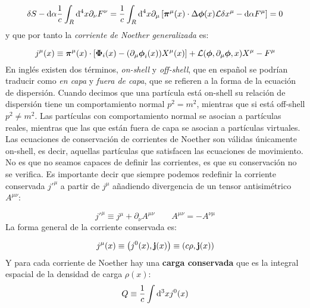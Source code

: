 \begin{equation}
 	\delta S - \mathrm{d} \alpha \frac{1}{c} \int_R\mathrm{d}^4 x \partial_\nu F^\nu = \frac{1}{c} \int_R\mathrm{d}^4 x \partial_\mu \left[ \boldsymbol{\pi}^\mu (x) \cdot \Delta \boldsymbol{\phi} (x)  \mathcal{L}  \delta x^\mu - \mathrm{d} \alpha F^\mu  \right] = 0
\end{equation}
y que por tanto la \textit{corriente de Noether generalizada} es: 

\begin{equation}
	j^\mu (x)\equiv \boldsymbol{\pi}^\mu (x) \cdot \left[  \boldsymbol{\Phi}_i (x) - (\partial_\mu \boldsymbol{\phi}_i (x))X^\mu(x) \right]+ \mathcal{L} (\boldsymbol{\phi},\partial_\mu \boldsymbol{\phi},x)  X^\mu - F^\mu
\end{equation}
En inglés existen dos términos, \textit{on-shell} y \textit{off-shell}, que en español se podrían traducir como \textit{en capa} y \textit{fuera de capa}, que se refieren  a la forma de la ecuación de dispersión. Cuando decimos que una partícula está on-shell su relación de dispersión tiene un comportamiento normal $p^2 = m^2$, mientras que si está off-shell $p^2 \neq m^2$. Las partículas con comportamiento normal se asocian a partículas reales, mientras que las que están fuera de capa se asocian a partículas virtuales. Las ecuaciones de conservación de corrientes de Noether son válidas únicamente on-shell, es decir, aquellas partículas que satisfacen las ecuaciones de movimiento. No es que no seamos capaces de definir las corrientes, es que su conservación no se verifica. Es importante decir que siempre podemos redefinir la corriente conservada $j'^\mu$ a partir de $j^\mu$ añadiendo divergencia de un tensor antisimétrico $A^{\mu \nu}$:

\begin{equation}
	j'^\mu \equiv j^\mu + \partial_\nu A^{\mu \nu} \qquad  A^{\mu \nu} = - A^{\nu \mu}
\end{equation}
La forma general de la corriente conservada es:

\begin{equation}
	j^\mu (x) \equiv \left( j^0(x),\mathbf{j}(x) \right) \equiv \left( c\rho,\mathbf{j}(x) \right)
\end{equation}
Y para cada corriente de Noether hay una \textbf{carga conservada} que es la integral espacial de la densidad de carga $\rho(x)$:
\begin{equation}
	Q \equiv  \frac{1}{c} \int \mathrm{d}^3 x j^0 (x)
\end{equation}



